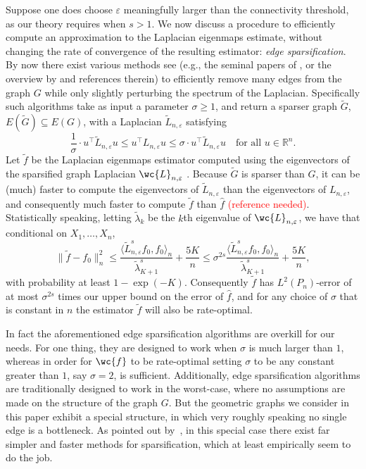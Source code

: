 \documentclass{article}
\newcommand{\Reals}{\mathbb{R}}
\newcommand{\1}{\mathbf{1}}
\newcommand{\dotp}[2]{\langle #1, #2 \rangle}
\newcommand{\wt}[1]{\widetilde{#1}}
\newcommand{\wh}[1]{\widehat{#1}}
\theoremstyle{alden}
\theoremstyle{aldenthm}
\theoremstyle{definition}
\theoremstyle{remark}
\begin{document}
Suppose one does choose $\varepsilon$ meaningfully larger than the connectivity threshold, as our theory requires when $s > 1$. We now discuss a procedure to efficiently compute an approximation to the Laplacian eigenmaps estimate, without changing the rate of convergence of the resulting estimator: \emph{edge sparsification}. By now there exist various methods see (e.g., the seminal papers of \citet{spielman2011,spielman2013,spielman2014}, or the overview by \citet{vishnoi2012} and references therein) to efficiently remove many edges from the graph $G$ while only slightly perturbing the spectrum of the Laplacian. Specifically such algorithms take as input a parameter $\sigma \geq 1$, and return a sparser graph $\wt{G}$, $E(\wt{G}) \subseteq E(G)$, with a Laplacian $\wt{L}_{n,\varepsilon}$ satisfying
\begin{equation*}
\frac{1}{\sigma} \cdot u^{\top} \wt{L}_{n,\varepsilon} u \leq u^{\top} L_{n,\varepsilon} u \leq \sigma \cdot u^{\top} \wt{L}_{n,\varepsilon}u \quad \textrm{for all $u \in \Reals^n$.}
\end{equation*}
Let $\wt{f}$ be the Laplacian eigenmaps estimator computed using the eigenvectors of the sparsified graph Laplacian $\wc{L}_{n,\varepsilon}$ . Because $\wt{G}$ is sparser than $G$, it can be (much) faster to compute the eigenvectors of $\wt{L}_{n,\varepsilon}$ than the eigenvectors of $L_{n,\varepsilon}$, and consequently much faster to compute $\wt{f}$ than $\wh{f}$ \textcolor{red}{(reference needed)}. Statistically speaking, letting $\wt{\lambda}_k$ be the $k$th eigenvalue of $\wc{L}_{n,\varepsilon}$, we have that conditional on $X_1,\ldots,X_n$,
\begin{equation*}
\|\wt{f} - f_0\|_n^2 \leq \frac{\dotp{\wt{L}_{n,\varepsilon}^s f_0}{f_0}_n}{\wt{\lambda}_{K + 1}^s} + \frac{5K}{n} \leq \sigma^{2s} \frac{\dotp{\wt{L}_{n,\varepsilon}^s f_0}{f_0}_n}{\wt{\lambda}_{K + 1}^s} + \frac{5K}{n},
\end{equation*}
with probability at least $1 - \exp(-K)$. Consequently $\wt{f}$ has $L^2(P_n)$-error of at most $\sigma^{2s}$ times our upper bound on the error of $\wh{f}$, and for any choice of $\sigma$ that is constant in $n$ the estimator $\wt{f}$ will also be rate-optimal. 

In fact the aforementioned edge sparsification algorithms are overkill for our needs. For one thing, they are designed to work when $\sigma$ is much larger than $1$, whereas in order for $\wc{f}$ to be rate-optimal setting $\sigma$ to be any constant greater than $1$, say $\sigma = 2$, is sufficient. Additionally, edge sparsification algorithms are traditionally designed to work in the worst-case, where no assumptions are made on the structure of the graph $G$. But the geometric graphs we consider in this paper exhibit a special structure, in which very roughly speaking no single edge is a bottleneck. As pointed out by~\citet{sadhanala16b}, in this special case there exist far simpler and faster methods for sparsification, which at least empirically seem to do the job.
\end{document}
